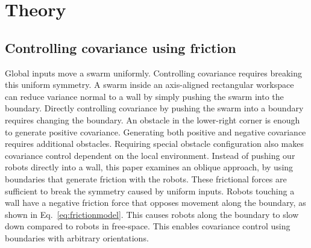 \section{Theory}
\label{sec:theory}
\subsection{Controlling covariance using friction}
Global inputs move a swarm uniformly.  
Controlling covariance requires breaking this uniform symmetry.  A swarm inside an axis-aligned rectangular workspace can reduce variance normal to a wall by simply pushing the swarm into the boundary. Directly controlling covariance by pushing the swarm into a boundary requires changing the boundary.  An obstacle in the lower-right corner is enough to generate positive covariance.  Generating both positive and negative covariance requires additional obstacles.  Requiring special obstacle configuration also makes covariance control dependent on the local environment. 
  Instead of pushing our robots directly into a wall, this paper examines an oblique approach, by using boundaries that generate friction with the robots.  These frictional forces are  sufficient to break the symmetry caused by uniform inputs.  Robots touching a wall have a negative friction force that opposes movement along the boundary, as shown in Eq.\ \eqref{eq:frictionmodel}.  This  causes robots along the boundary to slow down compared to robots in free-space. This enables covariance control using  boundaries with arbitrary orientations. 
  
